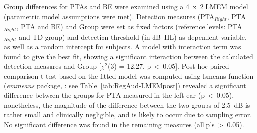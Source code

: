 \documentclass[a4paper, twoside]{templates/ociamthesis}
\begin{document}
Group differences for PTAs and BE were examined using a 4~x~2 LMEM model (parametric model assumptions were met). Detection measures (PTA\(_{Right}\), PTA\(_{Right}\), PTA and BE) and Group were set as fixed factors (reference levels: PTA\(_{Right}\) and TD group) and detection threshold (in dB~HL) as dependent variable, as well as a random intercept for subjects. A model with interaction term was found to give the best fit, showing a significant interaction between the calculated detection measures and Group {[}\(\chi^2\)(3) = 12.27, p~\textless~0.05{]}. Post-hoc paired comparison t-test based on the fitted model was computed using lsmeans function (\emph{emmeans} package, \textcite{emmeansPackageR}; see Table~\ref{tab:RegAud-LMEMpost}) revealed a significant difference between the groups for PTA measured in the left ear (p~\textless~0.05), nonetheless, the magnitude of the difference between the two groups of 2.5~dB is rather small and clinically negligible, and is likely to occur due to sampling error. No significant difference was found in the remaining measures (all p's~\textgreater~0.05).\\
\end{document}
